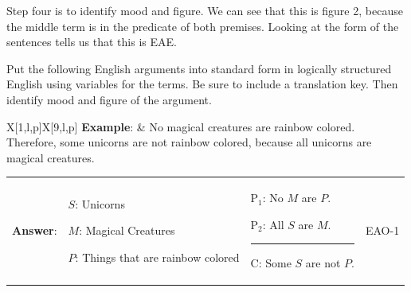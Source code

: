 Step four is to identify mood and figure. We can see that this is figure 2, because the middle term is in the predicate of both premises. Looking at the form of the sentences tells us that this is EAE. 


\practiceproblems
\noindent\problempart Put the following English arguments into standard form in logically structured English using variables for the terms. Be sure to include a translation key. Then identify mood and figure of the argument.
\begin{longtabu}{{X[1,l,p]X[9,l,p]}} 
\textbf{Example}: &  No magical creatures are rainbow colored. Therefore, some unicorns are not rainbow colored, because all unicorns are magical creatures.
\end{longtabu}
\vspace{-22pt}
\begin{longtabu}{p{.05\linewidth}p{.45\linewidth}p{.3\linewidth}p{.1\linewidth}} 
  
\textbf{Answer}: & 
\vspace{-16pt}
\begin{ekey}
\item[$S$:] Unicorns
\item[$M$:] Magical Creatures
\item[$P$:] Things that are rainbow colored
\end{ekey}

&
\vspace{-16pt}
\begin{earg}
\item[P$_1$:] No $M$ are $P$.
\item[P$_2$:] All $S$ are $M$.
\vspace{-.5em}
\item [] \rule{0.5\linewidth}{.5pt} 
\item[C:] Some $S$ are not $P$.
\end{earg} 

&
EAO-1 

\end{longtabu} 

